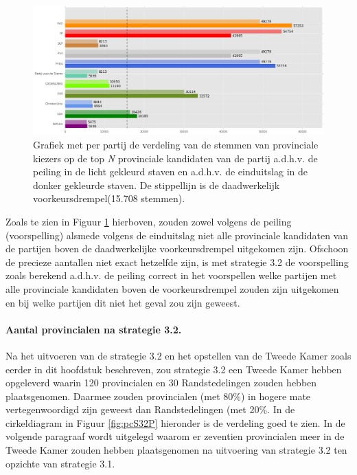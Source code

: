 \begin{figure}[H]

	\includegraphics[width=\linewidth]{stemmen_op_provincialen_eigenX_samen.png}

			\caption{Grafiek met per partij de verdeling van de stemmen van provinciale kiezers op de top \textit{N} provinciale kandidaten van de partij a.d.h.v. de peiling \citep{IPSOS} in de licht gekleurd staven en a.d.h.v. de einduitslag \citep{Kiesraad_databank} in de donker gekleurde staven. De stippellijn is de daadwerkelijk voorkeursdrempel(15.708 stemmen).}

\label{fig:stemmenS32P}
\end{figure}

Zoals te zien in Figuur \ref{fig:stemmenS32P} hierboven, zouden zowel volgens de peiling (voorspelling) alsmede volgens de einduitslag niet alle provinciale kandidaten van de partijen boven de daadwerkelijke voorkeursdrempel uitgekomen zijn. Ofschoon de precieze aantallen niet exact hetzelfde zijn, is met strategie 3.2 de voorspelling zoals berekend a.d.h.v. de peiling correct in het voorspellen welke partijen met alle provinciale kandidaten boven de voorkeursdrempel zouden zijn uitgekomen en bij welke partijen dit niet het geval zou zijn geweest.


\paragraph{Aantal provincialen na strategie 3.2.}
Na het uitvoeren van de strategie 3.2 en het opstellen van de Tweede Kamer zoals eerder in dit hoofdstuk beschreven, zou strategie 3.2 een Tweede Kamer hebben opgeleverd waarin 120 provincialen en 30 Randstedelingen zouden hebben plaatsgenomen. Daarmee zouden provincialen (met 80\%) in hogere mate vertegenwoordigd zijn geweest dan Randstedelingen (met 20\%. In de cirkeldiagram in Figuur \ref{fig:pcS32P} hieronder is de verdeling goed te zien. In de volgende paragraaf wordt uitgelegd waarom er zeventien provincialen meer in de Tweede Kamer zouden hebben plaatsgenomen na uitvoering van strategie 3.2 ten opzichte van strategie 3.1.

